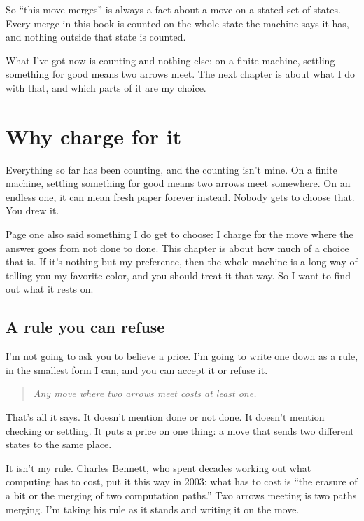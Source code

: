 \documentclass[11pt,twoside]{article}
\theoremstyle{thielethm}
\theoremstyle{thieledef}
\theoremstyle{thieledef}
\theoremstyle{thieledef}
\theoremstyle{thielethm}
\theoremstyle{thieleobs}
\theoremstyle{thielethm}
\begin{document}
So ``this move merges'' is always a fact about a move on a stated set of states. Every merge in this book is counted on the whole state the machine says it has, and nothing outside that state is counted.

What I've got now is counting and nothing else: on a finite machine, settling something for good means two arrows meet. The next chapter is about what I do with that, and which parts of it are my choice.

\section{Why charge for it}
\label{sec:why-charge}

Everything so far has been counting, and the counting isn't mine. On a finite machine, settling something for good means two arrows meet somewhere. On an endless one, it can mean fresh paper forever instead. Nobody gets to choose that. You drew it.

Page one also said something I do get to choose: I charge for the move where the answer goes from not done to done. This chapter is about how much of a choice that is. If it's nothing but my preference, then the whole machine is a long way of telling you my favorite color, and you should treat it that way. So I want to find out what it rests on.

\subsection{A rule you can refuse}

I'm not going to ask you to believe a price. I'm going to write one down as a rule, in the smallest form I can, and you can accept it or refuse it.

\begin{quote}
\textit{Any move where two arrows meet costs at least one.}
\end{quote}

That's all it says. It doesn't mention done or not done. It doesn't mention checking or settling. It puts a price on one thing: a move that sends two different states to the same place.

It isn't my rule. Charles Bennett, who spent decades working out what computing has to cost, put it this way in 2003: what has to cost is ``the erasure of a bit or the merging of two computation paths.'' Two arrows meeting is two paths merging. I'm taking his rule as it stands and writing it on the move.
\end{document}
